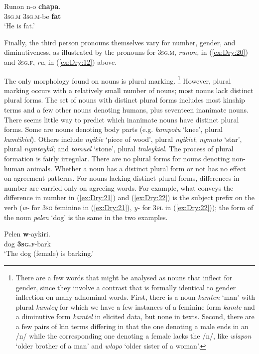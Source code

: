 \documentclass[output=collectionpaper]{langsci/langscibook}
\begin{document}
\ea \label{ex:Dry:20}
\gll Runon	n-o	\textbf{chapa}.\\
\textsc{3sg.m} \textsc{3sg.m}-be \textbf{fat}\\
\glt `He is fat.'
\z

Finally, the third person pronouns themselves vary for number, gender, and diminutiveness, as illustrated by the pronouns for \textsc{3sg.m,} \textit{runon,} in (\ref{ex:Dry:20}) and \textsc{3sg.f}, \textit{ru}, in (\ref{ex:Dry:12}) above.

The only morphology found on nouns is plural marking.%
\footnote{There are a few words that might be analysed as nouns that inflect for gender, since they involve a contrast that is formally identical to gender inflection on many adnominal words. First, there is a noun \textit{kamten} `man' with plural \textit{kamtey} for which we have a few instances of a feminine form \textit{kamte} and a diminutive form \textit{kamtel} in elicited data, but none in texts. Second, there are a few pairs of kin terms differing in that the one denoting a male ends in an /n/ while the corresponding one denoting a female lacks the /n/, like \textit{wlapon} `older brother of a man' and \textit{wlapo} `older sister of a woman'.} %
However, plural marking occurs with a relatively small number of nouns; most nouns lack distinct plural forms. The set of nouns with distinct plural forms includes most kinship terms and a few other nouns denoting humans, plus seventeen inanimate nouns. There seems little way to predict which inanimate nouns have distinct plural forms. Some are nouns denoting body parts (e.g. \textit{kampotu} `knee', plural \textit{kamtikiel}). Others include \textit{nyikie} `piece of wood', plural \textit{nyikiel}; \textit{nymuto} `star', plural \textit{nymteykil}; and \textit{tomuel} `stone', plural \textit{tmleykiel}. The process of plural formation is fairly irregular. There are no plural forms for nouns denoting non-human animals. Whether a noun has a distinct plural form or not has no effect on agreement patterns. For nouns lacking distinct plural forms, differences in number are carried only on agreeing words. For example, what conveys the difference in number in (\ref{ex:Dry:21}) and (\ref{ex:Dry:22}) is the subject prefix on the verb (\textit{w-} for \textsc{3sg} feminine in (\ref{ex:Dry:21}), \textit{y-} for \textsc{3pl} in (\ref{ex:Dry:22})); the form of the noun \textit{pelen} `dog' is the same in the two examples.

\ea \label{ex:Dry:21}
\gll Pelen	\textbf{w}-aykiri.\\
dog \textbf{\textsc{3sg.f}}-bark\\
\glt  `The dog (female) is barking.'
\z
\end{document}
